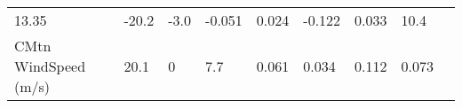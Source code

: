 \documentclass[11pt]{article}
\begin{document}
\begin{longtable}[]{@{}lllllllll@{}}
\begin{minipage}[t]{0.06\columnwidth}
13.35\strut
\end{minipage} & \begin{minipage}[t]{0.06\columnwidth}\raggedright\strut
-20.2\strut
\end{minipage} & \begin{minipage}[t]{0.08\columnwidth}\raggedright\strut
-3.0\strut
\end{minipage} & \begin{minipage}[t]{0.05\columnwidth}\raggedright\strut
-0.051\strut
\end{minipage} & \begin{minipage}[t]{0.07\columnwidth}\raggedright\strut
0.024\strut
\end{minipage} & \begin{minipage}[t]{0.06\columnwidth}\raggedright\strut
-0.122\strut
\end{minipage} & \begin{minipage}[t]{0.06\columnwidth}\raggedright\strut
0.033\strut
\end{minipage} & \begin{minipage}[t]{0.07\columnwidth}\raggedright\strut
10.4\strut
\end{minipage}\tabularnewline
\begin{minipage}[t]{0.25\columnwidth}\raggedright\strut
CMtn WindSpeed (m/s)\strut
\end{minipage} & \begin{minipage}[t]{0.06\columnwidth}\raggedright\strut
20.1\strut
\end{minipage} & \begin{minipage}[t]{0.06\columnwidth}\raggedright\strut
0\strut
\end{minipage} & \begin{minipage}[t]{0.08\columnwidth}\raggedright\strut
7.7\strut
\end{minipage} & \begin{minipage}[t]{0.05\columnwidth}\raggedright\strut
0.061\strut
\end{minipage} & \begin{minipage}[t]{0.07\columnwidth}\raggedright\strut
0.034\strut
\end{minipage} & \begin{minipage}[t]{0.06\columnwidth}\raggedright\strut
0.112\strut
\end{minipage} & \begin{minipage}[t]{0.06\columnwidth}\raggedright\strut
0.073\strut
\end{minipage} & \begin{minipage}[t]{0.07\columnwidth}\raggedright\strut

\end{minipage}
\end{longtable}
\end{document}
